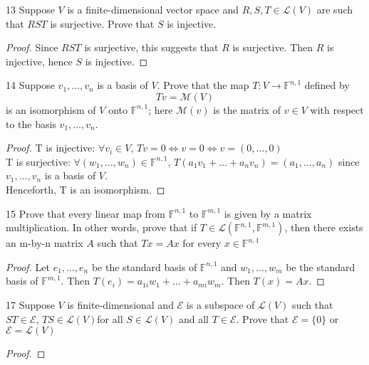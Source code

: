 \documentclass{article}
\newenvironment{problem}[1]{\begin{prob*}{#1}{}}{\end{prob*}}
\newcommand{\Hom}{\mathcal{L}}
\begin{document}
\begin{problem}{13}
Suppose $V$ is a finite-dimensional vector space and $R,S,T \in \mathcal{L}(V)$ are such that $RST$ is surjective. Prove that $S$ is injective.
\end{problem}
\begin{proof}
	Since $RST$ is surjective, this suggests that $R$ is surjective. Then $R$ is injective, hence $S$ is injective.
\end{proof}

\begin{problem}{14}
Suppose $v_1, \ldots ,v_n$ is a basis of $V$. Prove that the map $T: V \to \mathbb{F}^{n,1}$ defined by \[
	Tv = \mathcal{M}(V)\]
is an isomorphism of $V$ onto $\mathbb{F}^{n,1}$; here $\mathcal{M}(v)$ is the matrix of $v \in V$ with respect to the basis $v_1, \ldots, v_n.$
\end{problem}
\begin{proof}
	T is injective: $\forall v_i \in  V$, $Tv = 0 \iff v = 0 \iff v = (0, \ldots ,0)$ \\
	T is surjective: $\forall (w_1, \ldots ,w_n) \in \mathbb{F}^{n,1}$, $T(a_1v_1 + \ldots + a_nv_n) = (a_1, \ldots ,a_n)$ since $v_1, \ldots ,v_n$ is a basis of $V$. \\
	Henceforth, T is an isomorphism.
\end{proof}

\begin{problem}{15}
Prove that every linear map from $\mathbb{F}^{n,1}$ to $\mathbb{F}^{m,1}$ is given by a matrix multiplication. In other words, prove that if $T \in \mathcal{L}(\mathbb{F}^{n,1}, \mathbb{F}^{m,1})$, then there exists an m-by-n matrix $A$ such that $Tx = Ax$ for every $x \in \mathbb{F}^{n,1}$
\end{problem}
\begin{proof}
	Let $e_1, \ldots ,e_n$ be the standard basis of $\mathbb{F}^{n,1}$ and $w_1, \ldots ,w_m$ be the standard basis of $\mathbb{F}^{m,1}$. Then $T(e_i) = a_{1i}w_1 + \ldots + a_{mi}w_m$. Then $T(x) = Ax$.
\end{proof}


\begin{problem}{17}
Suppose $V$ is finite-dimensional and $\mathcal{E}$ is a subspace of $\mathcal{L}(V)$ such that $ST \in \mathcal{E}$, $TS \in \Hom(V)$for all $S \in \mathcal{L}(V)$ and all $T \in \mathcal{E}$. Prove that $\mathcal{E} = \{0\}$ or $\mathcal{E} = \mathcal{L}(V)$
\end{problem}
\begin{proof}
\end{proof}
\end{document}
